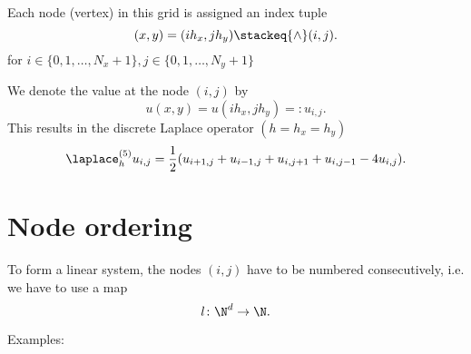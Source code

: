 
Each node (vertex) in this grid is assigned an index tuple
\[
	(x,y) = (ih_{x}, jh_{y}) \stackeq{\wedge} (i,j)
.\] 
for $i \in \{0,1, \ldots , N_{x}+1\}, j \in  \{0,1, \ldots , N_{y}+1\}$

We denote the value at the node $(i,j)$ by
\[
	u(x,y)=u(ih_{x},jh_{y})=:u_{i,j}
.\] 
This results in the discrete Laplace operator $(h=h_{x}=h_{y})$
\[
	\laplace_{h}^{(5)}u_{i,j}=\frac{1}{2}(u_{i+1,j}+u_{i-1,j} +u_{i,j+1}+ u_{i,j-1} - 4u_{i,j})
.\]

\newpage
\section{Node ordering}%
\label{sec:Node ordering}
To form a linear system, the nodes $(i,j)$ have to be numbered consecutively, i.e. we have to use a map
\[
	l\colon \N^{d} \rightarrow \N
.\] 

Examples:

